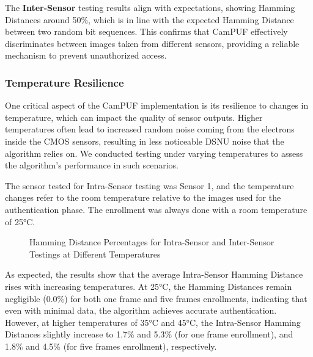 The \textbf{Inter-Sensor} testing results align with expectations, showing Hamming Distances around 50\%, which is in line with the expected Hamming Distance between two random bit sequences. This confirms that CamPUF effectively discriminates between images taken from different sensors, providing a reliable mechanism to prevent unauthorized access.

\subsubsection{Temperature Resilience}\label{sec:temperature}

One critical aspect of the CamPUF implementation is its resilience to changes in temperature, which can impact the quality of sensor outputs. Higher temperatures often lead to increased random noise coming from the electrons inside the CMOS sensors, resulting in less noticeable DSNU noise that the algorithm relies on. We conducted testing under varying temperatures to assess the algorithm's performance in such scenarios.

The sensor tested for Intra-Sensor testing was Sensor 1, and the temperature changes refer to the room temperature relative to the images used for the authentication phase. The enrollment was always done with a room temperature of 25°C.

\begin{figure}[h!]
	\centering
	\caption{Hamming Distance Percentages for Intra-Sensor and Inter-Sensor Testings at Different Temperatures}
	\label{fig:temperature_graph}
\end{figure}

As expected, the results show that the average Intra-Sensor Hamming Distance rises with increasing temperatures. At 25°C, the Hamming Distances remain negligible (0.0\%) for both one frame and five frames enrollments, indicating that even with minimal data, the algorithm achieves accurate authentication. However, at higher temperatures of 35°C and 45°C, the Intra-Sensor Hamming Distances slightly increase to 1.7\% and 5.3\% (for one frame enrollment), and 1.8\% and 4.5\% (for five frames enrollment), respectively.


